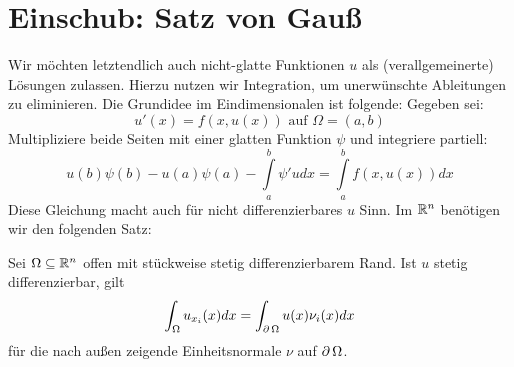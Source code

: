 \section{Einschub: Satz von Gauß}
\label{sec:para5}
Wir möchten letztendlich auch nicht-glatte Funktionen $u$ als (verallgemeinerte)  Lösungen zulassen. Hierzu nutzen wir Integration, um unerwünschte Ableitungen zu eliminieren. Die Grundidee im Eindimensionalen ist folgende: Gegeben sei:
\[ u'(x) = f(x,u(x)) \text{ auf } \Omega = (a,b) \]
Multipliziere beide Seiten mit einer glatten Funktion $\psi$ und integriere partiell:
\[ u(b)\psi(b) - u(a)\psi(a) - \int\limits_{a}^{b} \psi'u dx = \int\limits_{a}^{b} f(x,u(x)) dx \]
Diese Gleichung macht auch für nicht differenzierbares $u$ Sinn. Im $\mathbb{R}^n$ benötigen wir den folgenden Satz:

\begin{thm} \label{thm_13} \label{gauss}
	Sei $\Omega \subseteq \mathbb{R}^n$ offen mit stückweise stetig differenzierbarem Rand. Ist $u$ stetig differenzierbar, gilt \marginnote{[13]}
	\[ \int_{\Omega} u_{x_i}(x) dx = \int_{\operatorname{\partial} \Omega} u(x) \nu_i(x) dx \]
	für die nach außen zeigende Einheitsnormale $\nu$ auf $\operatorname{\partial}\Omega$.
\end{thm}
	
